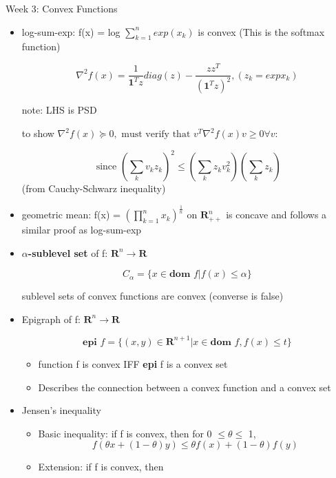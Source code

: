\documentclass{article}
\begin{document}
\begin{homeworkProblemName}{{\LARGE Week 3: Convex Functions}}
\begin{problemAnswer}
{\begin{itemize}
    \item log-sum-exp: f(x) = log $\sum_{k=1}^n exp (x_k)$ is convex (This is the
      softmax function)

      $$ \nabla^2 f(x) = \frac{1}{\textbf{1}^Tz} diag(z) -
      \frac{zz^T}{(\textbf{1}^Tz)^2}, (z_k = exp x_k) $$

      note: LHS is PSD

      to show $\nabla^2 f(x) \succeq 0, \text{ must verify that } v^T\nabla^2 f(x) v \geq 0 \forall v:$

      $$ \text{ since } (\sum_k v_kz_k)^2 \leq (\sum_k z_kv_k^2)(\sum_kz_k)$$ (from Cauchy-Schwarz inequality)

    \item geometric mean: f(x) = $(\prod_{k=1}^n x_k)^{\frac{1}{n}} \text{ on }
      \bm{R}_{++}^n$ is concave and follows a similar proof as log-sum-exp

    \item $\alpha$\textbf{-sublevel set} of f: $\bm{R}^n \rightarrow \bm{R}$

      $$ C_{\alpha} = \{x \in \textbf{dom } f | f(x) \leq \alpha\} $$

      sublevel sets of convex functions are convex (converse is false)

    \item Epigraph of f: $\bm{R}^n \rightarrow \bm{R}$

      $$ \textbf{epi } f = \{(x, y) \in \bm{R}^{n + 1} | x \in \textbf{dom } f,
      f(x) \leq t\} $$

      \begin{itemize}
      \item function f is convex IFF \textbf{epi} f is a convex set
      \item Describes the connection between a convex function and a convex set
      \end{itemize}
    \end{itemize}
    }\end{problemAnswer}

  \begin{problemAnswer}{
      \begin{itemize}
      \item Jensen's inequality
        \begin{itemize}
        \item Basic inequality: if f is convex, then for 0 $\leq \theta \leq$ 1,
          $$ f(\theta x + (1 - \theta)y) \leq \theta f(x) + (1 - \theta) f(y) $$
        \item Extension: if f is convex, then


\end{itemize}
\end{itemize}}
\end{problemAnswer}
\end{homeworkProblemName}
\end{document}
